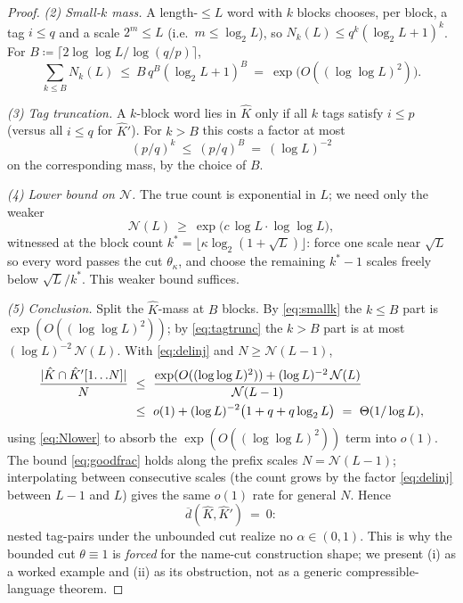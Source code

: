 \documentclass[11pt]{article}
\numberwithin{equation}{section}
\newcommand{\defeq}{\coloneqq}
\DeclarePairedDelimiter{\abs}{\lvert}{\rvert}
\newcommand{\dup}[2]{\overline{d}(#1,#2)}
\newcommand{\rest}[2]{#1[1\!\dots\! #2]}
\theoremstyle{plain}
\theoremstyle{definition}
\theoremstyle{remark}
\begin{document}
\begin{proof}
\emph{(2) Small-$k$ mass.} A length-$\le L$ word with $k$ blocks chooses, per block, a tag $i
\le q$ and a scale $2^m \le L$ (i.e.\ $m \le \log_2 L$), so $N_k(L) \le q^k(\log_2 L+1)^k$.
For $B \defeq \lceil 2 \log\log L / \log(q/p) \rceil$,
\begin{equation}\label{eq:smallk}
  \sum_{k \le B} N_k(L) \ \le\ B\, q^B (\log_2 L + 1)^B
  \ =\ \exp\!\bigl(O((\log\log L)^2)\bigr).
\end{equation}

\emph{(3) Tag truncation.} A $k$-block word lies in $\hat K$ only if all $k$ tags satisfy $i
\le p$ (versus all $i \le q$ for $\hat K'$). For $k > B$ this costs a factor at most
\begin{equation}\label{eq:tagtrunc}
  (p/q)^k \ \le\ (p/q)^B \ =\ (\log L)^{-2}
\end{equation}
on the corresponding mass, by the choice of $B$.

\emph{(4) Lower bound on $\mathcal N$.} The true count is exponential in $L$; we need only the
weaker
\begin{equation}\label{eq:Nlower}
  \mathcal N(L) \ \ge\ \exp\!\bigl(c\,\log L \cdot \log\log L\bigr),
\end{equation}
witnessed at the block count $k^* = \lfloor \kappa \log_2(1 + \sqrt L) \rfloor$: force one
scale near $\sqrt L$ so every word passes the cut $\theta_\kappa$, and choose the remaining
$k^*-1$ scales freely below $\sqrt L/k^*$. This weaker bound suffices.

\emph{(5) Conclusion.} Split the $\hat K$-mass at $B$ blocks. By \eqref{eq:smallk} the $k \le
B$ part is $\exp(O((\log\log L)^2))$; by \eqref{eq:tagtrunc} the $k > B$ part is at most
$(\log L)^{-2}\,\mathcal N(L)$. With \eqref{eq:delinj} and $N \ge \mathcal N(L-1)$,
\begin{align}\label{eq:goodfrac}
  \frac{\abs{\hat K \cap \rest{\hat K'}{N}}}{N}
  \ &\le\ \frac{\exp(O((\log\log L)^2)) + (\log L)^{-2}\,\mathcal N(L)}{\mathcal N(L-1)} \notag\\
  \ &\le\ o(1) + (\log L)^{-2}\bigl(1 + q + q\log_2 L\bigr)
  \ =\ \Theta(1/\log L),
\end{align}
using \eqref{eq:Nlower} to absorb the $\exp(O((\log\log L)^2))$ term into $o(1)$. The bound
\eqref{eq:goodfrac} holds along the prefix scales $N = \mathcal N(L-1)$; interpolating between
consecutive scales (the count grows by the factor \eqref{eq:delinj} between $L-1$ and $L$)
gives the same $o(1)$ rate for general $N$. Hence \[ \dup{\hat K}{\hat K'} \ =\ 0 : \] nested
tag-pairs under the unbounded cut realize no $\alpha \in (0,1)$. This is why the bounded cut
$\theta \equiv 1$ is \emph{forced} for the name-cut construction shape; we present (i) as a
worked example and (ii) as its obstruction, not as a generic compressible-language theorem.


\end{proof}
\end{document}
